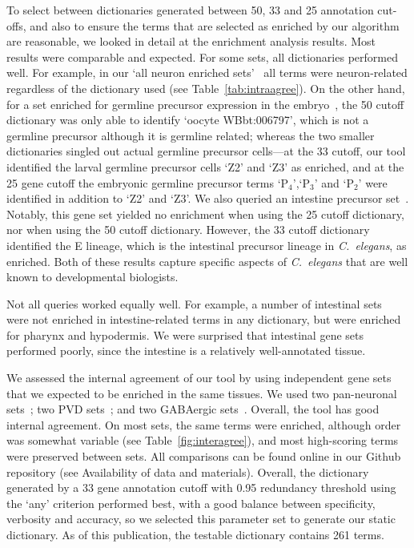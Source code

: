 To select between dictionaries generated between 50, 33 and 25 annotation
cut-offs, and also to ensure the terms that are selected as enriched by our
algorithm are reasonable, we looked in detail at the enrichment analysis results.
Most results were comparable and expected. For some sets, all dictionaries
performed well. For example, in our `all neuron enriched sets'~\cite{Spencer2011,
Watson2008a} all terms were neuron-related regardless of the dictionary used
(see Table~\ref{tab:intraagree}). On the other hand, for a set enriched for
germline precursor expression in the embryo~\cite{Spencer2011}, the 50 cutoff
dictionary was only able to identify `oocyte WBbt:006797', which is not a
germline precursor although it is germline related; whereas the two smaller
dictionaries singled out actual germline precursor cells---at the 33 cutoff, our
tool identified the larval germline precursor cells `Z2' and `Z3' as enriched,
and at the 25 gene cutoff the embryonic germline precursor terms `P$_4$',`P$_3$'
and `P$_2$' were identified in addition to `Z2' and `Z3'.
We also queried an intestine precursor set~\cite{Spencer2011}. Notably, this
gene set yielded no enrichment when using the 25 cutoff dictionary, nor when
using the 50 cutoff dictionary. However, the 33 cutoff dictionary identified the
E lineage, which is the intestinal precursor lineage in \emph{C.~elegans}, as
enriched. Both of these results capture specific aspects of \emph{C.~elegans}
that are well known to developmental biologists.

Not all queries worked equally well. For example, a number of intestinal
sets~\cite{Spencer2011, Pauli2006} were not enriched in intestine-related terms
in any dictionary, but were enriched for pharynx and hypodermis. We were
surprised that intestinal gene sets performed poorly, since the intestine is a
relatively well-annotated tissue.

We assessed the internal agreement of our tool by using independent gene sets
that we expected to be enriched in the same tissues. We used two  pan-neuronal
sets~\cite{Spencer2011, Watson2008a}; two PVD sets~\cite{Spencer2011, Smith2010};
and two  GABAergic sets~\cite{Spencer2011, Cinar2005}. Overall, the tool has
good internal agreement. On most sets, the same terms were enriched, although
order was somewhat variable (see Table~\ref{fig:interagree}), and most
high-scoring terms were preserved between sets. All comparisons can be found
online in our Github repository (see Availability of data and materials).
Overall, the dictionary generated by a 33 gene annotation cutoff with 0.95
redundancy threshold using the `any' criterion performed best, with a good
balance between specificity, verbosity and accuracy, so we selected this
parameter set to generate our static dictionary. As of this publication, the
testable dictionary contains 261 terms.


